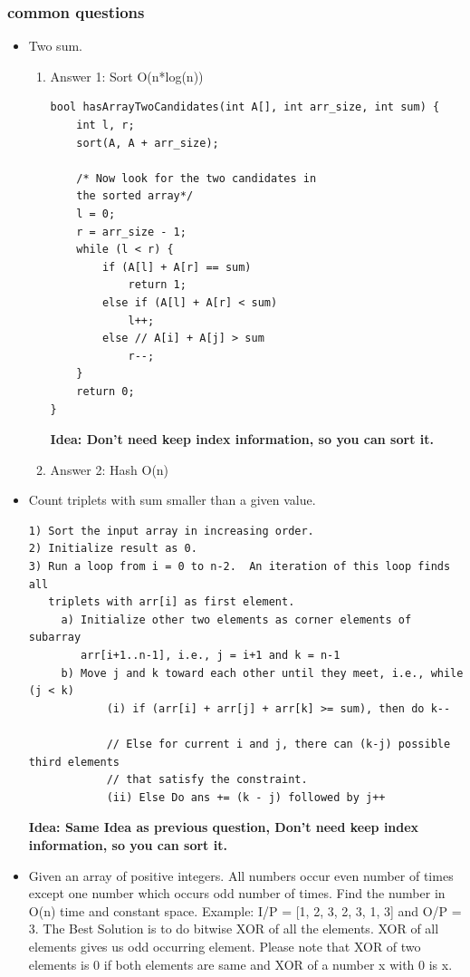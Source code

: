 \documentclass[a4paper,11pt,twoside]{book}
\begin{document}
\subsubsection{common questions}
\begin{itemize}
\item Two sum. 
\begin{enumerate}
\item Answer 1: Sort O(n*log(n))
\begin{lstlisting}[tabsize=3]
bool hasArrayTwoCandidates(int A[], int arr_size, int sum) { 
	int l, r; 
	sort(A, A + arr_size); 
	
	/* Now look for the two candidates in  
	the sorted array*/
	l = 0; 
	r = arr_size - 1; 
	while (l < r) { 
		if (A[l] + A[r] == sum) 
			return 1; 
		else if (A[l] + A[r] < sum) 
			l++; 
		else // A[i] + A[j] > sum 
			r--; 
	} 
	return 0; 
} 
\end{lstlisting}
\textbf{Idea: Don't need keep index information, so you can sort it. }
\item Answer 2: Hash O(n)
\end{enumerate}

\item Count triplets with sum smaller than a given value. 
\begin{lstlisting}[breaklines]
1) Sort the input array in increasing order. 
2) Initialize result as 0.
3) Run a loop from i = 0 to n-2.  An iteration of this loop finds all
   triplets with arr[i] as first element.
     a) Initialize other two elements as corner elements of subarray 
        arr[i+1..n-1], i.e., j = i+1 and k = n-1
     b) Move j and k toward each other until they meet, i.e., while (j < k)
            (i) if (arr[i] + arr[j] + arr[k] >= sum), then do k-- 

            // Else for current i and j, there can (k-j) possible third elements 
            // that satisfy the constraint.
            (ii) Else Do ans += (k - j) followed by j++ 
\end{lstlisting}
\textbf{Idea: Same Idea as previous question, Don't need keep index information, so you can sort it. }


\item Given an array of positive integers. All numbers occur even number of times except one number which occurs odd number of times. Find the number in O(n) time and constant space.
Example: I/P = [1, 2, 3, 2, 3, 1, 3] and O/P = 3. The Best Solution is to do bitwise XOR of all the elements. XOR of all elements gives us odd occurring element. Please note that XOR of two elements is 0 if both elements are same and XOR of a number x with 0 is x.


\end{itemize}
\end{document}
